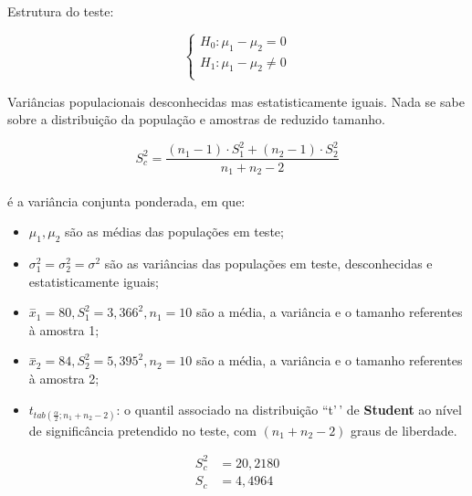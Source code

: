\documentclass[
]{book}
\providecommand{\tightlist}{%
  \setlength{\itemsep}{0pt}\setlength{\parskip}{0pt}}
\begin{document}
\hfill\break

Estrutura do teste:

\hfill\break

\[
\begin{cases}
  H_{0}: \mu_{1} - \mu_{2} = 0 \\
  H_{1}: \mu_{1} - \mu_{2} \ne 0 \\
\end{cases}
\]

\hfill\break

Variâncias populacionais desconhecidas mas estatisticamente iguais. Nada se sabe sobre a distribuição da população e amostras de reduzido tamanho.

\hfill\break

\[
S_{c}^{2} =  \frac{\left({n}_{1}-1\right)\cdot {S}_{1}^{2}+\left({n}_{2}-1\right)\cdot {S}_{2}^{2}}{{n}_{1}+{n}_{2}-2}
\]\\

é a variância conjunta ponderada, em que:

\begin{itemize}
\tightlist
\item
  \(\mu_{1} , \mu_{2}\) são as médias das populações em teste;\\
\item
  \(\sigma_{1}^{2}=\sigma_{2}^{2}=\sigma^{2}\) são as variâncias das populações em teste, desconhecidas e estatisticamente iguais;\\
\item
  \(\stackrel{-}{x}_{1}=80, S_{1}^{2}= 3,366^{2} , n_{1}=10\) são a média, a variância e o tamanho referentes à amostra 1;\\
\item
  \(\stackrel{-}{x}_{2}=84, S_{2}^{2}= 5,395^{2} , n_{2}=10\) são a média, a variância e o tamanho referentes à amostra 2;\\
\item
  \({t}_{tab\left(\frac{\alpha }{2};{n}_{1}+{n}_{2}-2\right)}\): o quantil associado na distribuição ``t'\,' de \textbf{Student} ao nível de significância pretendido no teste, com \(({n}_{1}+{n}_{2}-2)\) graus de liberdade.
\end{itemize}

\hfill\break

\begin{align*}
S_{c}^{2} & = 20,2180\\
S_{c} & = 4,4964
\end{align*}

\hfill\break
\end{document}
